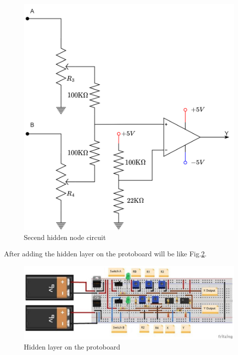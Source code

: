 \documentclass[a4paper, 12pt, AutoFakeBold]{report}
\newcommand{\figref}[1]{Fig.\ref{#1}}
\begin{document}
    \begin{figure}[H]
        \centering
        \includegraphics[scale=.2]{figs/Hidden_layer_secend.png}
        \caption{Secend hidden node circuit}
        \label{fig:Hidden_layer_secend}
    \end{figure}

    After adding the hidden layer on the protoboard will be like \figref{fig:Hidden_layer_onboard}.
    \begin{figure}[H]
        \centering
        \includegraphics[scale=.4]{figs/Hidden_layer_onboard.JPG}
        \caption{Hidden layer on the protoboard}
        \label{fig:Hidden_layer_onboard}
    \end{figure}
\end{document}
